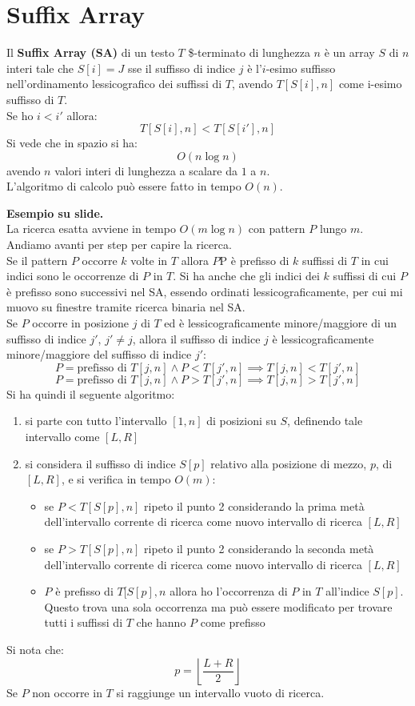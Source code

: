 \documentclass[a4paper,12pt, oneside]{book}
\begin{document}
\section{Suffix Array}
\begin{definizione}
  Il \textbf{Suffix Array (SA)} di un testo $T$ \$-terminato di lunghezza $n$ è
  un array $S$ di $n$ interi tale che $S[i]=J$ sse il suffisso di indice $j$ è
  l'$i$-esimo suffisso nell'ordinamento lessicografico dei suffissi di $T$,
  avendo $T[S[i],n]$ come i-esimo suffisso di $T$.\\
  Se ho $i< i'$ allora:
  \[T[S[i],n]<T[S[i'],n]\]
  Si vede che in spazio si ha:
  \[O(n\log n)\]
  avendo $n$ valori interi di lunghezza a scalare da $1$ a $n$.\\
  L'algoritmo di calcolo può essere fatto in tempo $O(n)$.
\end{definizione}
\textbf{Esempio su slide.}\\
La ricerca esatta avviene in tempo $O(m\log n)$ con pattern $P$ lungo $m$.\\
Andiamo avanti per step per capire la ricerca.\\
Se il pattern $P$ occorre $k$ volte in $T$ allora $P$P è prefisso di $k$
suffissi di $T$ in cui indici sono le occorrenze di $P$ in $T$. Si ha anche che
gli indici dei $k$ suffissi di cui $P$ è prefisso sono successivi nel SA,
essendo ordinati lessicograficamente, per cui mi muovo su finestre tramite
ricerca binaria nel SA.\\
Se $P$ occorre in posizione $j$ di $T$ ed è lessicograficamente minore/maggiore
di un suffisso di indice $j'$, $j'\neq j$, allora il suffisso di indice $j$ è
lessicograficamente minore/maggiore del suffisso di indice $j'$:
\[ P= \mbox{prefisso di }T[j,n] \land P < T[j',n] \implies T[j,n] < T[j',n]\]
\[P = \mbox{prefisso di }T[j,n] \land P > T[j',n] \implies T[j,n] > T[j',n]\]
Si ha quindi il seguente algoritmo:
\begin{enumerate}
  \item si parte con tutto l'intervallo $[1,n]$ di posizioni su $S$, definendo
  tale intervallo come $[L,R]$
  \item si considera il suffisso di indice $S[p]$ relativo alla posizione di
  mezzo, $p$, di $[L,R]$, e si verifica in tempo $O(m)$:
  \begin{itemize}
    \item se $P<T[S[p],n]$ ripeto il punto 2 considerando la prima metà
    dell'intervallo corrente di ricerca come nuovo intervallo di ricerca $[L,R]$
    \item se $P>T[S[p],n]$ ripeto il punto 2 considerando la seconda metà
    dell'intervallo corrente di ricerca come nuovo intervallo di ricerca $[L,R]$
    \item $P$ è prefisso di $T[S[p],n$ allora ho l'occorrenza di $P$ in $T$
    all'indice $S[p]$. Questo trova una sola occorrenza ma può essere modificato
    per trovare tutti i suffissi di $T$ che hanno $P$ come prefisso
  \end{itemize}  
\end{enumerate}
Si nota che:
\[p=\left\lfloor\frac{L+R}{2}\right\rfloor\]
Se $P$ non occorre in $T$ si raggiunge un intervallo vuoto di ricerca.
\end{document}
